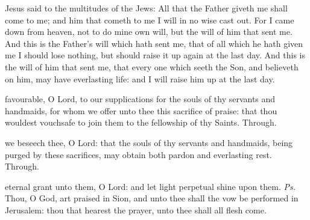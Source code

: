  Jesus said to the multitudes of the Jews: All that the Father giveth me shall come to me; and him that cometh to me I will in no wise cast out. For I came down from heaven, not to do mine own will, but the will of him that sent me. And this is the Father's will which hath sent me, that of all which he hath given me I should lose nothing, but should raise it up again at the last day. And this is the will of him that sent me, that every one which seeth the Son, and believeth on him, may have everlasting life: and I will raise him up at the last day.


\secret
{} favourable, O Lord, to our supplications for the souls of thy servants and handmaids, for whom we offer unto thee this sacrifice of praise: that thou wouldest vouchsafe to join them to the fellowship of thy Saints. Through.


\postcommunion
{} we beseech thee, O Lord: that the souls of thy servants and handmaids, being purged by these sacrifices, may obtain both pardon and everlasting rest. Through.


\clearpage
{}\label{AllSoulsIII}

\introit
{} eternal grant unto them, O Lord: and let light perpetual shine upon them. \textit{Ps.} Thou, O God, art praised in Sion, and unto thee shall the vow be performed in Jerusalem: thou that hearest the prayer, unto thee shall all flesh come.

